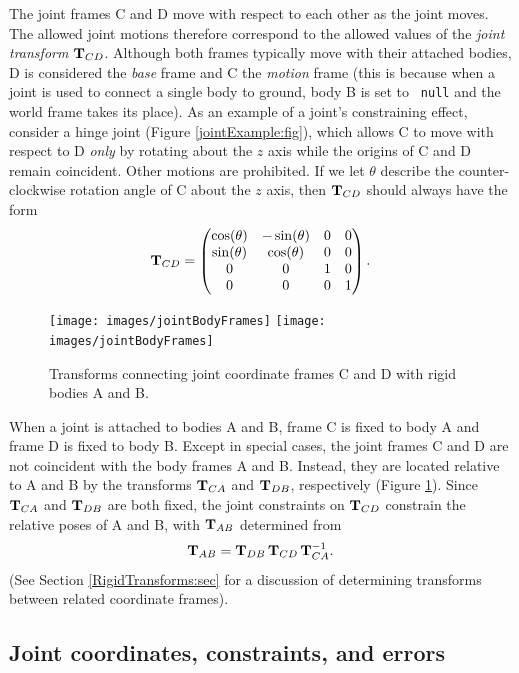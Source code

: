 The joint frames C and D move with respect to each other as the joint
moves. The allowed joint motions therefore correspond to the allowed
values of the {\it joint transform} ${\bf T}_{CD}$.  Although both frames
typically move with their attached bodies, D is considered the {\it
base} frame and C the {\it motion} frame (this is because when a joint
is used to connect a single body to ground, body B is set to {\tt
null} and the world frame takes its place).  As an example of a
joint's constraining effect, consider a hinge joint (Figure
\ref{jointExample:fig}), which allows C to move with respect to D {\it only} by
rotating about the $z$ axis while the origins of C and D remain
coincident. Other motions are prohibited. If we let $\theta$ describe
the counter-clockwise rotation angle of C about the $z$ axis, then
${\bf T}_{CD}$ should always have the form
%
\begin{equation}
{\bf T}_{CD} = \left(\begin{matrix}
\cos(\theta) & -\sin(\theta) & 0 & 0 \\
\sin(\theta) &  \cos(\theta) & 0 & 0 \\
0 & 0 & 1 & 0 \\
0 & 0 & 0 & 1 
\end{matrix}\right).
\end{equation}
%

\begin{figure}[ht]
\begin{center}
 \iflatexml
   \texttt{[image: images/jointBodyFrames]}
 \else
   \texttt{[image: images/jointBodyFrames]}
 \fi
\end{center}
\caption{Transforms connecting joint coordinate frames C and D with
rigid bodies A and B.}
\label{jointBodyFrames:fig}
\end{figure}

When a joint is attached to bodies A and B, frame C is fixed to body A
and frame D is fixed to body B. Except in special cases, the joint
frames C and D are not coincident with the body frames A
and B.  Instead, they are located relative to A and B by the
transforms ${\bf T}_{CA}$ and ${\bf T}_{DB}$, respectively
(Figure \ref{jointBodyFrames:fig}). Since ${\bf T}_{CA}$ and ${\bf T}_{DB}$ are
both fixed, the joint constraints on ${\bf T}_{CD}$ constrain the relative
poses of A and B, with ${\bf T}_{AB}$ determined from
%
\begin{equation}
{\bf T}_{AB} = {\bf T}_{DB} \, {\bf T}_{CD} \, {\bf T}_{CA}^{-1}.
\label{jointPose:eqn}
\end{equation}
%
(See Section \ref{RigidTransforms:sec} for a discussion of determining
transforms between related coordinate frames).

\subsection{Joint coordinates, constraints, and errors}
\label{JointCoordinates:sec}

